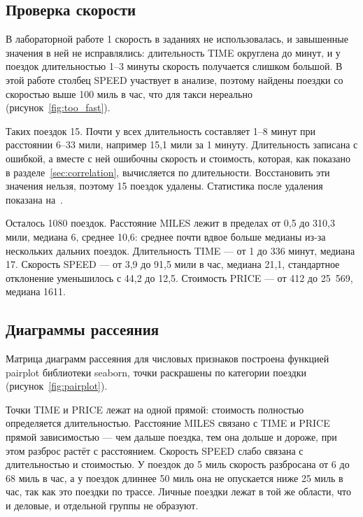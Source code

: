 \documentclass[a4paper,14pt]{extarticle}
\begin{document}
\subsection{Проверка скорости}

В лабораторной работе 1 скорость в заданиях не использовалась, и завышенные значения в ней не исправлялись: длительность TIME округлена до минут, и у поездок длительностью 1–3 минуты скорость получается слишком большой. В этой работе столбец SPEED участвует в анализе, поэтому найдены поездки со скоростью выше 100 миль в час, что для такси нереально (рисунок~\ref{fig:too_fast}).


Таких поездок 15. Почти у всех длительность составляет 1–8 минут при расстоянии 6–33 мили, например 15,1 мили за 1 минуту. Длительность записана с ошибкой, а вместе с ней ошибочны скорость и стоимость, которая, как показано в разделе~\ref{sec:correlation}, вычисляется по длительности. Восстановить эти значения нельзя, поэтому 15 поездок удалены. Статистика после удаления показана на~.


Осталось 1080 поездок. Расстояние MILES лежит в пределах от 0,5 до 310,3 мили, медиана 6, среднее 10,6: среднее почти вдвое больше медианы из-за нескольких дальних поездок. Длительность TIME — от 1 до 336 минут, медиана 17. Скорость SPEED — от 3,9 до 91,5 мили в час, медиана 21,1, стандартное отклонение уменьшилось с 44,2 до 12,5. Стоимость PRICE — от 412 до 25~569, медиана 1611.

\subsection{Диаграммы рассеяния}

Матрица диаграмм рассеяния для числовых признаков построена функцией pairplot библиотеки seaborn, точки раскрашены по категории поездки (рисунок~\ref{fig:pairplot}).


Точки TIME и PRICE лежат на одной прямой: стоимость полностью определяется длительностью. Расстояние MILES связано с TIME и PRICE прямой зависимостью — чем дальше поездка, тем она дольше и дороже, при этом разброс растёт с расстоянием. Скорость SPEED слабо связана с длительностью и стоимостью. У поездок до 5 миль скорость разбросана от 6 до 68 миль в час, а у поездок длиннее 50 миль она не опускается ниже 25 миль в час, так как это поездки по трассе. Личные поездки лежат в той же области, что и деловые, и отдельной группы не образуют.
\end{document}
